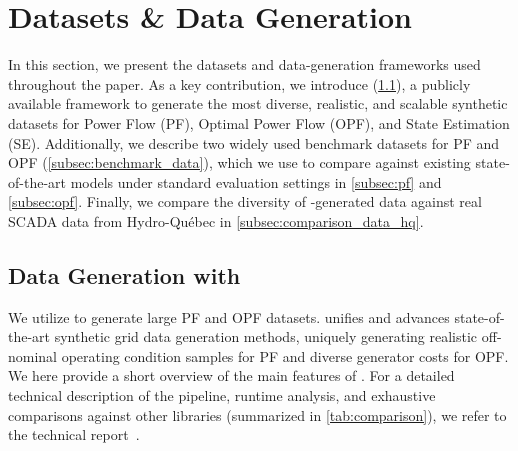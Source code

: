 \section{Datasets \& Data Generation}
\label{sec:dataset}

In this section, we present the datasets and data-generation frameworks used throughout the paper. As a key contribution, we introduce \datakit (\cref{subsec:datakit}), a publicly available framework to generate the most diverse, realistic, and scalable synthetic datasets for Power Flow (PF), Optimal Power Flow (OPF), and State Estimation (SE). Additionally, we describe two widely used benchmark datasets for PF and OPF (\cref{subsec:benchmark_data}), which we use to compare \genco against existing state-of-the-art models under standard evaluation settings in \cref{subsec:pf} and \cref{subsec:opf}. Finally, we compare the diversity of \datakit-generated data against real SCADA data from Hydro-Québec in \cref{subsec:comparison_data_hq}.







\subsection{Data Generation with \datakit}
\label{subsec:datakit}
We utilize \datakit to generate large PF and OPF datasets. \datakit unifies and advances state-of-the-art synthetic grid data generation methods, uniquely generating realistic off-nominal operating condition samples for PF and diverse generator costs for OPF. We here provide a short overview of the main features of \datakit. For a detailed technical description of the pipeline, runtime analysis, and exhaustive comparisons against other libraries (summarized in \cref{tab:comparison}), we refer to the \datakit technical report~\cite{puech2025gridfmdatakitv1pythonlibraryscalable}.


